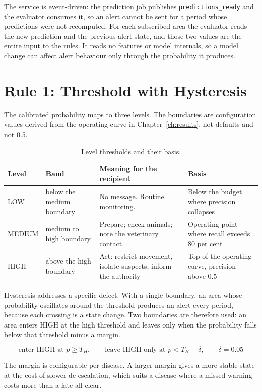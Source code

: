 \documentclass[10pt,openany]{report}
\begin{document}
The service is event-driven: the prediction job publishes \texttt{predictions\_ready} and the evaluator
consumes it, so an alert cannot be sent for a period whose predictions were not recomputed. For each
subscribed area the evaluator reads the new prediction and the previous alert state, and those two
values are the entire input to the rules. It reads no features or model internals, so a model change
can affect alert behaviour only through the probability it produces.

\section{Rule 1: Threshold with Hysteresis}

The calibrated probability maps to three levels. The boundaries are configuration values derived
from the operating curve in Chapter~\ref{ch:results}, not defaults and not 0.5.

\begin{table}[htbp]
\centering
\caption{Level thresholds and their basis.}
\label{tab:thresholds}
\small
\begin{tabular}{@{}p{1.6cm}p{2.6cm}p{5.4cm}p{3.4cm}@{}}
\toprule
\textbf{Level} & \textbf{Band} & \textbf{Meaning for the recipient} & \textbf{Basis} \\
\midrule
LOW & below the medium boundary & No message. Routine monitoring. & Below the budget where precision collapses \\
MEDIUM & medium to high boundary & Prepare; check animals; note the veterinary contact & Operating point where recall exceeds 80 per cent \\
HIGH & above the high boundary & Act: restrict movement, isolate suspects, inform the authority & Top of the operating curve, precision above 0.5 \\
\bottomrule
\end{tabular}
\end{table}

Hysteresis addresses a specific defect. With a single boundary, an area whose probability oscillates
around the threshold produces an alert every period, because each crossing is a state change. Two
boundaries are therefore used: an area enters HIGH at the high threshold and leaves only when the
probability falls below that threshold minus a margin.

\[
\text{enter HIGH at } p \ge T_H, \qquad
\text{leave HIGH only at } p < T_H - \delta, \qquad \delta = 0.05
\]

The margin is configurable per disease. A larger margin gives a more stable state at the cost of
slower de-escalation, which suits a disease where a missed warning costs more than a late all-clear.
\end{document}
